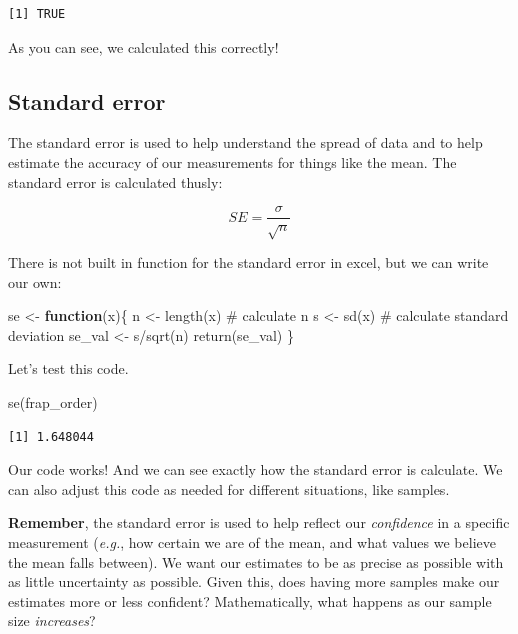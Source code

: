 \documentclass[
  letterpaper,
  DIV=11,
  numbers=noendperiod]{scrreprt}
\newenvironment{Shaded}{\begin{snugshade}}{\end{snugshade}}
\newcommand{\CommentTok}[1]{\textcolor[rgb]{0.37,0.37,0.37}{#1}}
\newcommand{\ControlFlowTok}[1]{\textcolor[rgb]{0.00,0.23,0.31}{\textbf{#1}}}
\newcommand{\FunctionTok}[1]{\textcolor[rgb]{0.28,0.35,0.67}{#1}}
\newcommand{\NormalTok}[1]{\textcolor[rgb]{0.00,0.23,0.31}{#1}}
\newcommand{\OtherTok}[1]{\textcolor[rgb]{0.00,0.23,0.31}{#1}}
\newcommand{\SpecialCharTok}[1]{\textcolor[rgb]{0.37,0.37,0.37}{#1}}
\begin{document}
\begin{verbatim}
[1] TRUE
\end{verbatim}

As you can see, we calculated this correctly!

\subsection{Standard error}\label{standard-error}

The standard error is used to help understand the spread of data and to
help estimate the accuracy of our measurements for things like the mean.
The standard error is calculated thusly:

\[
SE = \frac{\sigma}{\sqrt{n}}
\]

There is not built in function for the standard error in excel, but we
can write our own:

\begin{Shaded}
\begin{Highlighting}[]
\NormalTok{se }\OtherTok{\textless{}{-}} \ControlFlowTok{function}\NormalTok{(x)\{}
\NormalTok{  n }\OtherTok{\textless{}{-}} \FunctionTok{length}\NormalTok{(x) }\CommentTok{\# calculate n}
\NormalTok{  s }\OtherTok{\textless{}{-}} \FunctionTok{sd}\NormalTok{(x) }\CommentTok{\# calculate standard deviation}
\NormalTok{  se\_val }\OtherTok{\textless{}{-}}\NormalTok{ s}\SpecialCharTok{/}\FunctionTok{sqrt}\NormalTok{(n)}
  \FunctionTok{return}\NormalTok{(se\_val)}
\NormalTok{\}}
\end{Highlighting}
\end{Shaded}

Let's test this code.

\begin{Shaded}
\begin{Highlighting}[]
\FunctionTok{se}\NormalTok{(frap\_order)}
\end{Highlighting}
\end{Shaded}

\begin{verbatim}
[1] 1.648044
\end{verbatim}

Our code works! And we can see exactly how the standard error is
calculate. We can also adjust this code as needed for different
situations, like samples.

\textbf{Remember}, the standard error is used to help reflect our
\emph{confidence} in a specific measurement (\emph{e.g.}, how certain we
are of the mean, and what values we believe the mean falls between). We
want our estimates to be as precise as possible with as little
uncertainty as possible. Given this, does having more samples make our
estimates more or less confident? Mathematically, what happens as our
sample size \emph{increases}?
\end{document}
